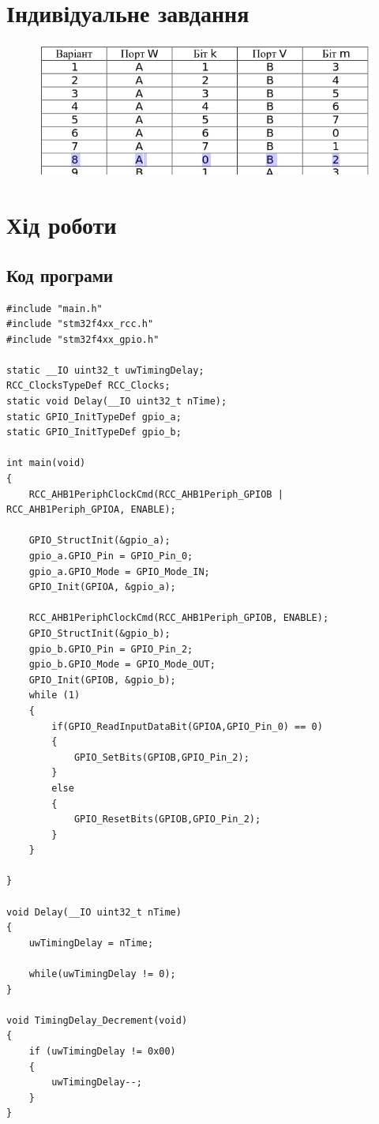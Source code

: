 \documentclass{article}
\begin{document}
\begin{normalsize}
		\section*{Індивідуальне завдання}
		\begin{figure}[H]
			\centering
			\includegraphics[scale=0.7]{v2}
		\end{figure}
		
		\section*{Хід роботи}
		\subsection*{Код програми}
		\begin{lstlisting}
#include "main.h"
#include "stm32f4xx_rcc.h"
#include "stm32f4xx_gpio.h"

static __IO uint32_t uwTimingDelay;
RCC_ClocksTypeDef RCC_Clocks;
static void Delay(__IO uint32_t nTime);
static GPIO_InitTypeDef gpio_a;
static GPIO_InitTypeDef gpio_b;

int main(void)
{
	RCC_AHB1PeriphClockCmd(RCC_AHB1Periph_GPIOB | RCC_AHB1Periph_GPIOA, ENABLE);
	
	GPIO_StructInit(&gpio_a);
	gpio_a.GPIO_Pin = GPIO_Pin_0;
	gpio_a.GPIO_Mode = GPIO_Mode_IN;   
	GPIO_Init(GPIOA, &gpio_a); 
	
	RCC_AHB1PeriphClockCmd(RCC_AHB1Periph_GPIOB, ENABLE); 
	GPIO_StructInit(&gpio_b);
	gpio_b.GPIO_Pin = GPIO_Pin_2;
	gpio_b.GPIO_Mode = GPIO_Mode_OUT;   
	GPIO_Init(GPIOB, &gpio_b);  
	while (1) 
	{
		if(GPIO_ReadInputDataBit(GPIOA,GPIO_Pin_0) == 0) 
		{
			GPIO_SetBits(GPIOB,GPIO_Pin_2);
		}
		else
		{
			GPIO_ResetBits(GPIOB,GPIO_Pin_2);
		}
	}
	
}

void Delay(__IO uint32_t nTime)
{ 
	uwTimingDelay = nTime;
	
	while(uwTimingDelay != 0);
}

void TimingDelay_Decrement(void)
{
	if (uwTimingDelay != 0x00)
	{ 
		uwTimingDelay--;
	}
}
		\end{lstlisting}


\end{normalsize}
\end{document}
